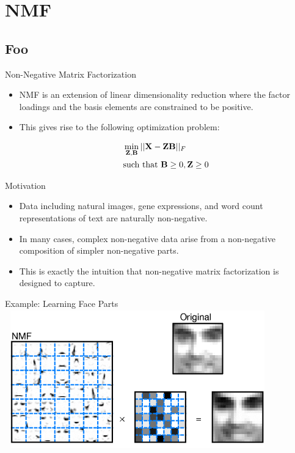 \documentclass[serif,xcolor=pdftex,dvipsnames,table,hyperref={bookmarks=false,breaklinks}]{beamer}
\begin{document}
\section{NMF}
\subsection{Foo}

\begin{frame}[t]{Non-Negative Matrix Factorization}

\begin{itemize}
\item NMF is an extension of linear dimensionality reduction where 
the factor loadings and the basis elements are constrained to be positive.
 
\pause\item This gives rise to the following optimization problem:

{\Large
\begin{align*}
&\min_{{\mathbf{Z}},{\mathbf{B}}} ||{\mathbf{X}} - {\mathbf{Z}}{\mathbf{B}} ||_F\\
&\mbox{such that } {\mathbf{B}}\geq 0, {\mathbf{Z}}\geq 0
\end{align*}
}
 
\end{itemize} 
\end{frame}

\begin{frame}[t]{Motivation}

\begin{itemize}
\item Data including natural images, gene expressions, and word count 
representations of text are naturally non-negative.

\pause\item In many cases, complex non-negative data arise from a 
non-negative composition of simpler non-negative parts.

\pause\item This is exactly the intuition that non-negative matrix 
factorization is designed to capture.


\end{itemize}
\end{frame}

\begin{frame}[t]{Example: Learning Face Parts}
\center
\includegraphics[width=4.5in]{../Figures/nmf.png}
\end{frame}
\end{document}
